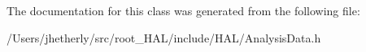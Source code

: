 The documentation for this class was generated from the following file\-:\begin{DoxyCompactItemize}
\item 
/\-Users/jhetherly/src/root\-\_\-\-H\-A\-L/include/\-H\-A\-L/Analysis\-Data.\-h\end{DoxyCompactItemize}
